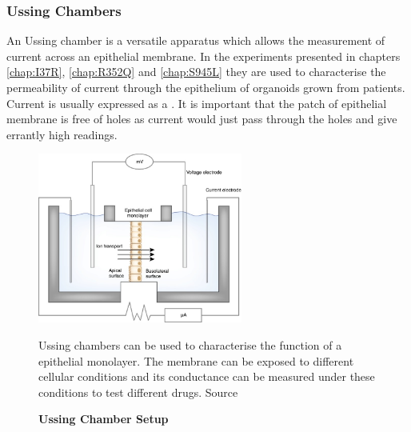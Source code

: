 \subsubsection{Ussing Chambers}
An Ussing chamber is a versatile apparatus which allows the measurement of current across an epithelial membrane. In the experiments presented in chapters \ref{chap:I37R}, \ref{chap:R352Q} and \ref{chap:S945L} they are used to characterise the permeability of current through the epithelium of organoids grown from patients. Current is usually expressed as a . It is important that the patch of epithelial membrane is free of holes as current would just pass through the holes and give errantly high readings.

\begin{figure}
	\label{ussing_chamber}
	\begin{center}
	\includegraphics[width=0.6\textwidth]{figures/ussing_chamber.jpg}
	\end{center}
	\captionsetup{singlelinecheck = false, justification=raggedright}
	\caption[Ussing Chamber Setup] {\textbf{Ussing Chamber Setup}}{Ussing chambers can be used to characterise the function of a epithelial monolayer. The membrane can be exposed to different cellular conditions and its conductance can be measured under these conditions to test different drugs. Source \cite{hoenig2014}} 
\end{figure}

